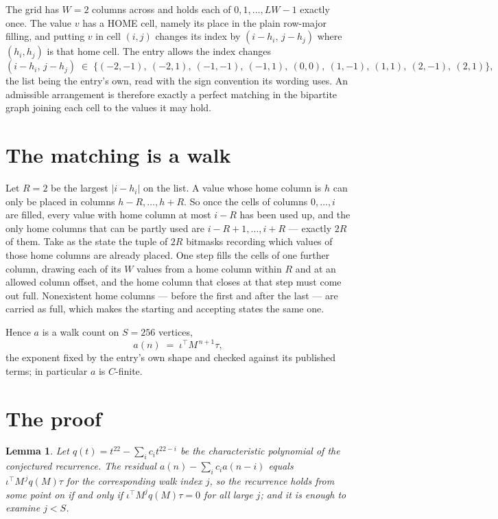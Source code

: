 \documentclass[11pt,a4paper]{article}
\theoremstyle{plain}
\newtheorem{lemma}[theorem]{Lemma}
\theoremstyle{definition}
\begin{document}
The grid has $W=2$ columns across and holds each of $0,1,\dots,LW-1$ exactly once. The value
$v$ has a HOME cell, namely its place in the plain row-major filling, and putting $v$ in cell
$(i,j)$ changes its index by $(i-h_i,\,j-h_j)$ where $(h_i,h_j)$ is that home cell. The entry
allows the index changes
\[
(i-h_i,\,j-h_j)\;\in\;\{(-2,-1),\ (-2,1),\ (-1,-1),\ (-1,1),\ (0,0),\ (1,-1),\ (1,1),\ (2,-1),\ (2,1)\},
\]
the list being the entry's own, read with the sign convention its wording uses. An admissible
arrangement is therefore exactly a perfect matching in the bipartite graph joining each cell to
the values it may hold.

\section{The matching is a walk}

Let $R=2$ be the largest $|i-h_i|$ on the list. A value whose home column is $h$ can only be
placed in columns $h-R,\dots,h+R$. So once the cells of columns $0,\dots,i$ are filled, every
value with home column at most $i-R$ has been used up, and the only home columns that can be
partly used are $i-R+1,\dots,i+R$ --- exactly $2R$ of them. Take as the state the tuple of
$2R$ bitmasks recording which values of those home columns are already placed. One step fills
the cells of one further column, drawing each of its $W$ values from a home column within $R$
and at an allowed column offset, and the home column that closes at that step must come out
full. Nonexistent home columns --- before the first and after the last --- are carried as
full, which makes the starting and accepting states the same one.

Hence $a$ is a walk count on $S=256$ vertices,
\[
a(n)\;=\;\iota^{\!\top}M^{\,n+1}\tau ,
\]
the exponent fixed by the entry's own shape and checked against its published terms; in
particular $a$ is $C$-finite.

\section{The proof}

\begin{lemma}\label{lem:crit}
Let $q(t)=t^{22}-\sum_i c_it^{22-i}$ be the characteristic polynomial of the
conjectured recurrence. The residual $a(n)-\sum_ic_ia(n-i)$ equals
$\iota^{\!\top}M^{\,j}q(M)\tau$ for the corresponding walk index $j$, so the recurrence
holds from some point on if and only if $\iota^{\!\top}M^{j}q(M)\tau=0$ for all large $j$;
and it is enough to examine $j<S$.
\end{lemma}
\end{document}
